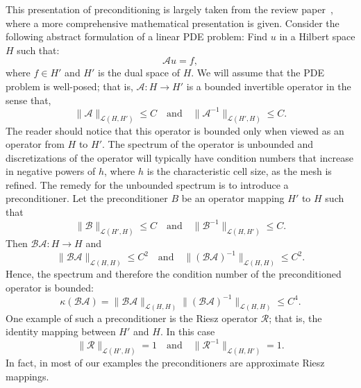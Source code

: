 This presentation of preconditioning is largely taken from the review
paper~\citep{MardalWinther11}, where a more comprehensive mathematical
presentation is given. Consider the following abstract formulation of
a linear PDE problem: Find $u$ in a Hilbert space $H$ such that:
\begin{equation}
\mathcal{A} u = f,
\end{equation}
where $f\in H'$ and $H'$ is the dual space of $H$.
We will assume that the PDE problem is well-posed; that is,
$\mathcal{A} : H \rightarrow H'$ is a bounded invertible operator in the sense that,
\begin{equation}
\|\mathcal{A}\|_{\mathcal{L} (H, H')} \le C \quad \mbox{and} \quad
\|\mathcal{A}^{-1}\|_{\mathcal{L} (H', H)} \le C.
\end{equation}
The reader should notice that this operator is bounded only when
viewed as an operator from $H$ to $H'$.  The spectrum of the operator
is unbounded and discretizations of the operator will typically have
condition numbers that increase in negative powers of $h$, where $h$
is the characteristic cell size, as the mesh is refined.  The remedy
for the unbounded spectrum is to introduce a preconditioner.  Let the
preconditioner $B$ be an operator mapping $H'$ to $H$ such that
\begin{equation}
\|\mathcal{B}\|_{\mathcal{L}(H', H)} \le C \quad \mbox{and} \quad
\|\mathcal{B}^{-1}\|_{\mathcal{L}(H, H')} \le C.
\end{equation}
Then
$\mathcal{B}\mathcal{A}: H \rightarrow H$ and
\begin{equation}
\|\mathcal{B}\mathcal{A}\|_{\mathcal{L}(H, H)} \le C^2 \quad \mbox{and} \quad
\|(\mathcal{B}\mathcal{A})^{-1}\|_{\mathcal{L}(H, H)} \le C^2.
\end{equation}
Hence, the spectrum and therefore the condition number of the
preconditioned operator is bounded:
\begin{equation}
  \kappa(\mathcal{B}\mathcal{A}) = \|\mathcal{B}\mathcal{A}\|_{\mathcal{L}(H, H)} \|(\mathcal{B}\mathcal{A})^{-1}\|_{\mathcal{L}(H, H)} \le C^4.
\end{equation}
One example of such a preconditioner is the Riesz operator
$\mathcal{R}$; that is, the identity mapping between $H'$ and $H$.  In
this case
\begin{equation}
\|\mathcal{R}\|_{\mathcal{L}(H', H)} = 1 \quad \mbox{and} \quad
\|\mathcal{R}^{-1}\|_{\mathcal{L}(H, H')} = 1.
\end{equation}
In fact, in most of our examples the preconditioners are approximate Riesz mappings.

